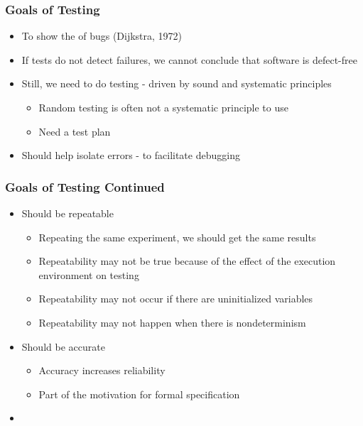 \documentclass[t,12pt,numbers,fleqn]{beamer}
\begin{document}

\begin{frame}
\frametitle{Goals of Testing}

\begin{itemize}

\item To show the  of bugs (Dijkstra, 1972)
\item If tests do not detect failures, we cannot conclude that software is defect-free
\item Still, we need to do testing - driven by sound and systematic principles
\begin{itemize}
\item Random testing is often not a systematic principle to use
\item Need a test plan
\end{itemize}
\item Should help isolate errors - to facilitate debugging

\end{itemize}

\end{frame}


\begin{frame}
\frametitle{Goals of Testing Continued}

\begin{itemize}
\item Should be repeatable
\begin{itemize}
\item Repeating the same experiment, we should get the same results
\item Repeatability may not be true because of the effect of the execution
  environment on testing
\item Repeatability may not occur if there are uninitialized variables
\item Repeatability may not happen when there is nondeterminism
\end{itemize}

\item Should be accurate
\begin{itemize}
\item Accuracy increases reliability
\item Part of the motivation for formal specification
\end{itemize}

\item {}

\end{itemize}

\end{frame}
\end{document}
